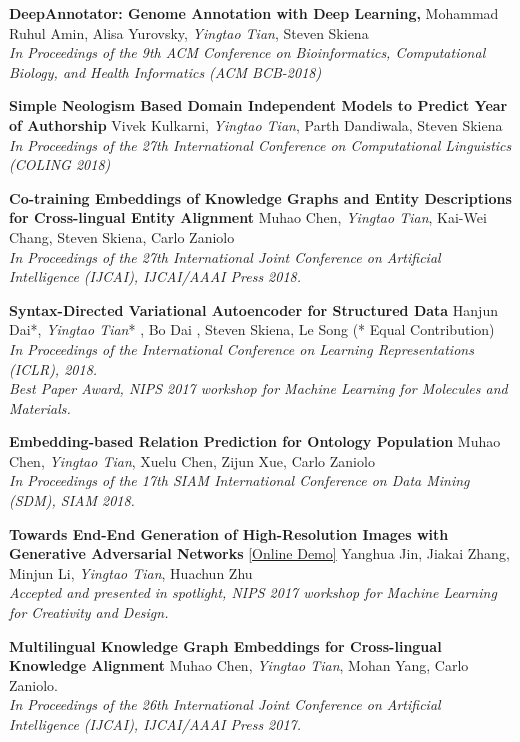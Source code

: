 \documentclass[line,margin]{cv}
\begin{document}
\begin{resume}
	{\bf DeepAnnotator: Genome Annotation with Deep Learning,}
	Mohammad Ruhul Amin, Alisa Yurovsky, \emph{Yingtao Tian}, Steven Skiena \\
	\emph{In Proceedings of the 9th ACM Conference on Bioinformatics, Computational Biology, and Health Informatics (ACM BCB-2018)}
	
	{\bf Simple Neologism Based Domain Independent Models to Predict Year of Authorship}
	 Vivek Kulkarni, \emph{Yingtao Tian}, Parth Dandiwala, Steven Skiena \\
	\emph{In Proceedings of the 27th International Conference on Computational Linguistics (COLING 2018)}

	{\bf Co-training Embeddings of Knowledge Graphs and Entity Descriptions for Cross-lingual Entity Alignment}
	Muhao Chen, \emph{Yingtao Tian}, Kai-Wei Chang, Steven Skiena, Carlo Zaniolo\\
	\emph{In Proceedings of the 27th International Joint Conference on Artificial Intelligence (IJCAI), IJCAI/AAAI Press 2018.}
	
    {\bf Syntax-Directed Variational Autoencoder for Structured Data}
    Hanjun Dai*, \emph{Yingtao Tian}* , Bo Dai , Steven Skiena, Le Song (* Equal Contribution)\\
    \emph{In Proceedings of the International Conference on Learning Representations (ICLR), 2018. \\
    Best Paper Award, NIPS 2017 workshop for Machine Learning for Molecules and Materials.}
    
	{\bf Embedding-based Relation Prediction for Ontology Population}
	Muhao Chen, \emph{Yingtao Tian}, Xuelu Chen, Zijun Xue, Carlo Zaniolo\\
	\emph{In Proceedings of the 17th SIAM International Conference on Data Mining (SDM), SIAM 2018.}

    {\bf Towards End-End Generation of High-Resolution Images with Generative Adversarial Networks}
    \href{http://make.girls.moe/#/}{[Online Demo]}
    Yanghua Jin, Jiakai Zhang, Minjun Li, \emph{Yingtao Tian}, Huachun Zhu\\
    \emph{Accepted and presented in spotlight, NIPS 2017 workshop for Machine Learning for Creativity and Design.}

    {\bf Multilingual Knowledge Graph Embeddings for Cross-lingual Knowledge Alignment}
    Muhao Chen, \emph{Yingtao Tian}, Mohan Yang, Carlo Zaniolo.\\
    \emph{In Proceedings of the 26th International Joint Conference on Artificial Intelligence (IJCAI), IJCAI/AAAI Press 2017.}


\end{resume}
\end{document}
